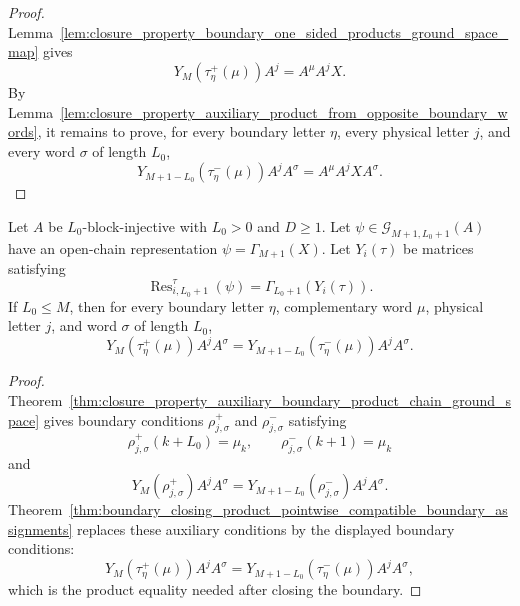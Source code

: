 \begin{proof}
    \notready
    Lemma~\ref{lem:closure_property_boundary_one_sided_products_ground_space_map}
    gives
    \[
        Y_M(\tau^+_{\eta}(\mu))A^j
        =
        A^\mu A^j X .
    \]
    By
    Lemma~\ref{lem:closure_property_auxiliary_product_from_opposite_boundary_words},
    it remains to prove, for every boundary letter $\eta$, every physical
    letter $j$, and every word $\sigma$ of length $L_0$,
    \[
        Y_{M+1-L_0}(\tau^-_{\eta}(\mu))A^jA^\sigma
        =
        A^\mu A^jXA^\sigma .
    \]
\end{proof}

\begin{theorem}
    \label{thm:boundary_closing_word_equation_chain_ground_space}
    \leanok
    Let $A$ be $L_0$-block-injective with $L_0>0$ and $D\ge1$. Let
    $\psi\in\mathcal G_{M+1,L_0+1}(A)$ have an open-chain representation
    $\psi=\Gamma_{M+1}(X)$.  Let $Y_i(\tau)$ be matrices satisfying
    \[
        \operatorname{Res}^{\tau}_{i,L_0+1}(\psi)
        =
        \Gamma_{L_0+1}(Y_i(\tau)).
    \]
    If $L_0\le M$, then for every
    boundary letter $\eta$, complementary word $\mu$, physical letter $j$, and
    word $\sigma$ of length $L_0$,
    \[
        Y_M(\tau^{+}_{\eta}(\mu))A^jA^\sigma
        =
        Y_{M+1-L_0}(\tau^{-}_{\eta}(\mu))A^jA^\sigma .
    \]
\end{theorem}

\begin{proof}
    \notready
    Theorem~\ref{thm:closure_property_auxiliary_boundary_product_chain_ground_space}
    gives boundary conditions $\rho^+_{j,\sigma}$ and
    $\rho^-_{j,\sigma}$ satisfying
    \[
        \rho^+_{j,\sigma}(k+L_0)=\mu_k,
        \qquad
        \rho^-_{j,\sigma}(k+1)=\mu_k
    \]
    and
    \[
        Y_M(\rho^+_{j,\sigma})A^jA^\sigma
        =
        Y_{M+1-L_0}(\rho^-_{j,\sigma})A^jA^\sigma .
    \]
    Theorem~\ref{thm:boundary_closing_product_pointwise_compatible_boundary_assignments}
    replaces these auxiliary conditions by the displayed boundary conditions:
    \[
        Y_M(\tau^{+}_{\eta}(\mu))A^jA^\sigma
        =
        Y_{M+1-L_0}(\tau^{-}_{\eta}(\mu))A^jA^\sigma,
    \]
    which is the product equality needed after closing the boundary.
\end{proof}

